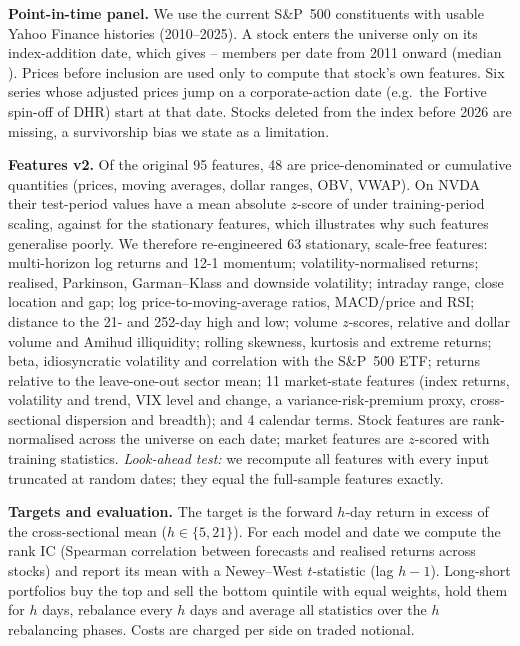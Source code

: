 \textbf{Point-in-time panel.} We use the \spN{} current S\&P~500 constituents with usable Yahoo Finance histories (2010--2025). A stock enters the universe only on its index-addition date, which gives \spMin--\spMax{} members per date from 2011 onward (median \spMed). Prices before inclusion are used only to compute that stock's own features. Six series whose adjusted prices jump on a corporate-action date (e.g.\ the Fortive spin-off of DHR) start at that date. Stocks deleted from the index before 2026 are missing, a survivorship bias we state as a limitation.

\textbf{Features v2.} Of the original 95 features, 48 are price-denominated or cumulative quantities (prices, moving averages, dollar ranges, OBV, VWAP). On NVDA their test-period values have a mean absolute $z$-score of \csNvdaAbsZLevel{} under training-period scaling, against \csNvdaAbsZStat{} for the stationary features, which illustrates why such features generalise poorly. We therefore re-engineered 63 stationary, scale-free features: multi-horizon log returns and 12-1 momentum; volatility-normalised returns; realised, Parkinson, Garman--Klass and downside volatility; intraday range, close location and gap; log price-to-moving-average ratios, MACD/price and RSI; distance to the 21- and 252-day high and low; volume $z$-scores, relative and dollar volume and Amihud illiquidity; rolling skewness, kurtosis and extreme returns; beta, idiosyncratic volatility and correlation with the S\&P~500 ETF; returns relative to the leave-one-out sector mean; 11 market-state features (index returns, volatility and trend, VIX level and change, a variance-risk-premium proxy, cross-sectional dispersion and breadth); and 4 calendar terms. Stock features are rank-normalised across the universe on each date; market features are $z$-scored with training statistics. \emph{Look-ahead test:} we recompute all features with every input truncated at random dates; they equal the full-sample features exactly.

\textbf{Targets and evaluation.} The target is the forward $h$-day return in excess of the cross-sectional mean ($h\in\{5,21\}$). For each model and date we compute the rank IC (Spearman correlation between forecasts and realised returns across stocks) and report its mean with a Newey--West $t$-statistic (lag $h-1$). Long-short portfolios buy the top and sell the bottom quintile with equal weights, hold them for $h$ days, rebalance every $h$ days and average all statistics over the $h$ rebalancing phases. Costs are charged per side on traded notional.


